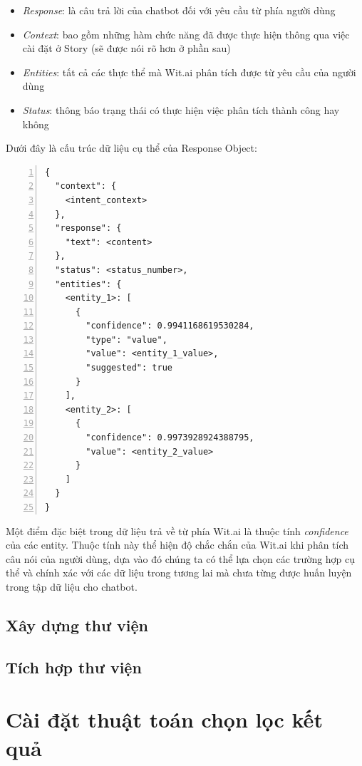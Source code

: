\documentclass[12pt]{report}
\begin{document}
\begin{itemize}
	\item \textit{Response}: là câu trả lời của chatbot đối với yêu cầu từ phía người dùng
	\item \textit{Context}: bao gồm những hàm chức năng đã được thực hiện thông qua việc cài đặt ở Story (sẽ được nói rõ hơn ở phần sau)
	\item \textit{Entities}: tất cả các thực thể mà Wit.ai phân tích được từ yêu cầu của người dùng
	\item \textit{Status}: thông báo trạng thái có thực hiện việc phân tích thành công hay không
\end{itemize}

Dưới đây là cấu trúc dữ liệu cụ thể của Response Object:

\begin{lstlisting}[frame=lines, basicstyle=\footnotesize\ttfamily, numbers=left, numberstyle=\tiny\color{black},caption= {Cấu trúc một API trả về}, backgroundcolor=\color{background}]
{
  "context": {
    <intent_context>
  },
  "response": {
    "text": <content>
  },
  "status": <status_number>,
  "entities": {
    <entity_1>: [
      {
        "confidence": 0.9941168619530284,
        "type": "value",
        "value": <entity_1_value>,
        "suggested": true
      }
    ],
    <entity_2>: [
      {
        "confidence": 0.9973928924388795,
        "value": <entity_2_value>
      }
    ]
  }
}
\end{lstlisting}

Một điểm đặc biệt trong dữ liệu trả về từ phía Wit.ai là thuộc tính \textit{confidence} của các entity. Thuộc tính này thể hiện độ chắc chắn của Wit.ai khi phân tích câu nói của người dùng, dựa vào đó chúng ta có thể lựa chọn các trường hợp cụ thể và chính xác với các dữ liệu trong tương lai mà chưa từng được huấn luyện trong tập dữ liệu cho chatbot.

\subsection{Xây dựng thư viện}

\subsection{Tích hợp thư viện}

\section{Cài đặt thuật toán chọn lọc kết quả}
\end{document}
